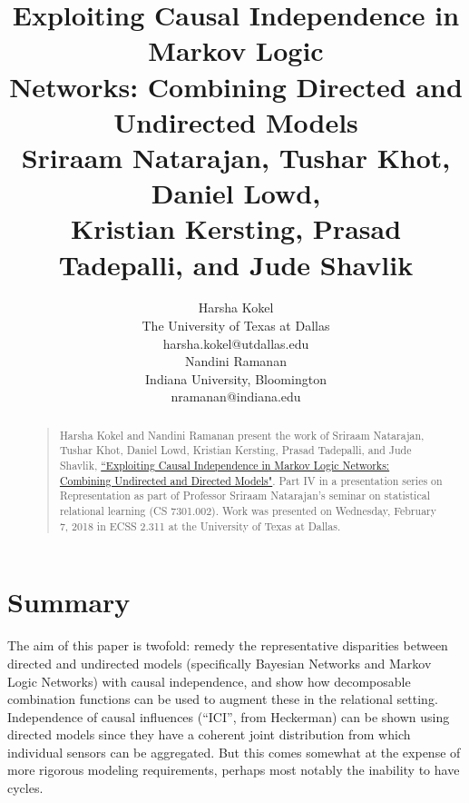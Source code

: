 \documentclass[letterpaper]{article}
\begin{document}
%
\title{Exploiting Causal Independence in Markov Logic\\Networks: Combining Directed and Undirected Models\\
\large Sriraam Natarajan, Tushar Khot, Daniel Lowd,\\Kristian Kersting, Prasad Tadepalli, and Jude Shavlik
}
\author{Harsha Kokel\\
The University of Texas at Dallas\\
harsha.kokel@utdallas.edu\\
\And
Nandini Ramanan\\
Indiana University, Bloomington\\
nramanan@indiana.edu\\
}

\maketitle
\begin{abstract}
\begin{quote}
Harsha Kokel and Nandini Ramanan present the work of Sriraam Natarajan, Tushar Khot, Daniel Lowd, Kristian Kersting, Prasad Tadepalli, and Jude Shavlik, \href{http://homes.soic.indiana.edu/natarasr/Papers/Natarajan.ECML10.pdf}{``Exploiting Causal Independence in Markov Logic Networks: Combining Undirected and Directed Models"}. Part IV in a presentation series on Representation as part of Professor Sriraam Natarajan's seminar on statistical relational learning (CS 7301.002). Work was presented on Wednesday, February 7, 2018 in ECSS 2.311 at the University of Texas at Dallas.
\end{quote}
\end{abstract}

\section{Summary}

The aim of this paper is twofold: remedy the representative disparities between directed and undirected models (specifically Bayesian Networks and Markov Logic Networks) with causal independence, and show how decomposable combination functions can be used to augment these in the relational setting. Independence  of causal influences (``ICI'', from Heckerman) can be shown using directed models since they have a coherent joint distribution from which individual sensors can be aggregated. But this comes somewhat at the expense of more rigorous modeling requirements, perhaps most notably the inability to have cycles.
\end{document}
